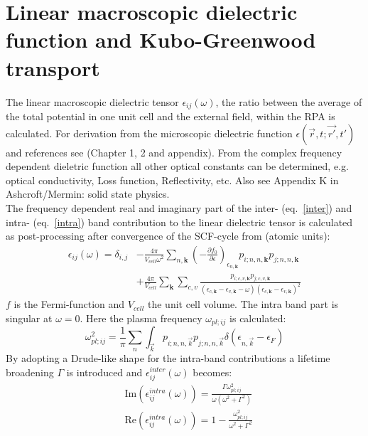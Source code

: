 \section{Linear macroscopic dielectric function and Kubo-Greenwood transport}

The linear macroscopic dielectric tensor $\epsilon_{ij}(\omega)$, the ratio between the average of the total potential in one unit cell and the external field, 
within the RPA is calculated. For derivation from the microscopic dielectric function $\epsilon(\vec{r},t;\vec{r'},t')$ and references see \cite{Draxl06} 
(Chapter 1, 2 and appendix). From the complex frequency dependent dieletric function all other optical constants can be determined, e.g. optical conductivity, 
Loss function, Reflectivity, etc. Also see Appendix K in Ashcroft/Mermin: solid state physics.\\
The frequency dependent real and imaginary part of the inter- (eq.~\ref{inter}) and intra- (eq.~\ref{intra}) band contribution to the linear dielectric tensor is calculated as post-processing after 
convergence of the SCF-cycle from (atomic units):
\begin{align}
 \epsilon_{ij}(\omega)=\delta_{i,j}&-\frac{4\pi}{ V_{cell}\omega^2}\sum_{n,\mathbf{k}}\left(-\frac{\partial f_0}{\partial \epsilon}\right)_{\epsilon_{n,\mathbf{k}}}p_{i;n,n,\mathbf{k}}p_{j;n,n,\mathbf{k}}\label{intra}\\
                       &+\frac{4\pi}{V_{cell}}\sum_{\mathbf{k}}\sum_{c,v}\frac{p_{i;c,v,\mathbf{k}}p_{j;c,v,\mathbf{k}}}{\left(\epsilon_{c,\mathbf{k}}-\epsilon_{v,\mathbf{k}}-\omega\right)\left(\epsilon_{c,\mathbf{k}}-\epsilon_{v,\mathbf{k}}\right)^2}\label{inter}
 \end{align}
$f$ is the Fermi-function and $V_{cell}$ the unit cell volume. The intra band part is singular at $\omega=0$. Here the plasma frequency $\omega_{pl;ij}$ is calculated:
\begin{equation}
 \omega^2_{pl;ij}=\frac{1}{\pi }\sum_n\int_{\vec{k}}p_{i;n,n,\vec{k}}p_{j;n,n,\vec{k}}\delta(\epsilon_{n,\vec{k}}-\epsilon_{F})
\end{equation}
By adopting a Drude-like shape for the intra-band contributions a lifetime broadening $\Gamma$ is introduced and $\epsilon_{ij}^{inter}(\omega)$ becomes:
\begin{align}
 &\mathrm{Im}(\epsilon_{ij}^{intra}(\omega))=\frac{\Gamma\omega^2_{pl;ij}}{\omega(\omega^2+\Gamma^2)}\\
&\mathrm{Re}(\epsilon_{ij}^{intra}(\omega))=1-\frac{\omega^2_{pl;ij}}{\omega^2+\Gamma^2}
\end{align}
